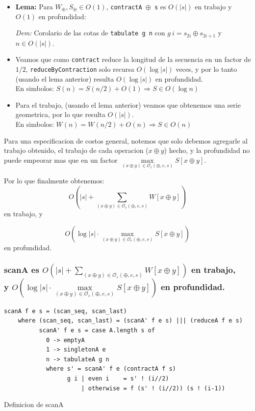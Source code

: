 \documentclass[12pt]{article}
\begin{document}
\begin{itemize}
\item \textbf{Lema:} Para $W_\oplus,S_\oplus \in O(1)$, \texttt{contractA $\oplus$ s} es $O(|s|)$ en trabajo y $O(1)$ en profundidad:

 \textit{Dem:} Corolario de las cotas de \texttt{tabulate g n} con $g\ i = s_{2i}\oplus s_{2i+1}$ y $n\in O(|s|)$.
\end{itemize}
\begin{itemize}
\item Veamos que como \texttt{contract} reduce la longitud de la secuencia en un factor de $1/2$, \texttt{reduceByContraction} solo recursa $O(\log |s|)$ veces, y por lo tanto (usando el lema anterior) resulta $O(\log |s|)$ en profundidad.\\
En simbolos: $S(n) = S(n/2) + O(1) \Rightarrow S \in O(\log n)$

\item Para el trabajo, (usando el lema anterior) veamos que obtenemos una serie geometrica, por lo que resulta $O(|s|)$.\\
En simbolos: $W(n) = W(n/2) + O(n) \Rightarrow S \in O(n)$
\end{itemize}
Para una especificacion de costos general, notemos que solo debemos agregarle al trabajo obtenido, el trabajo de cada operacion ($x\oplus y$) hecho, y la profundidad no puede empeorar mas que en un factor $\max\limits_{(x\oplus y)\in\mathcal{O}_r(\oplus,e,s)} S[x\oplus y]$.

Por lo que finalmente obtenemos:
$$O(|s| + \sum\limits_{(x\oplus y)\in\mathcal{O}_r(\oplus,e,s)} W[x\oplus y])$$ en trabajo, y

$$ O(\log |s|\cdot \max\limits_{(x\oplus y)\in\mathcal{O}_r(\oplus,e,s)} S[x\oplus y])$$ en profundidad.

\subsubsection{scanA es $O(|s| + \sum\limits_{(x\oplus y)\in\mathcal{O}_s(\oplus,e,s)} W[x\oplus y])$ en trabajo,\\
y $ O(\log |s|\cdot \max\limits_{(x\oplus y)\in\mathcal{O}_s(\oplus,e,s)} S[x\oplus y])$ en profundidad.}



\begin{table}[h]
\begin{lstlisting}
scanA f e s = (scan_seq, scan_last)
    where (scan_seq, scan_last) = (scanA' f e s) ||| (reduceA f e s)
          scanA' f e s = case A.length s of
            0 -> emptyA
            1 -> singletonA e
            n -> tabulateA g n
            where s' = scanA' f e (contractA f s)
                  g i | even i    = s' ! (i//2)
                      | otherwise = f (s' ! (i//2)) (s ! (i-1))
\end{lstlisting}
\caption{Definicion de scanA}
\end{table}
\end{document}
